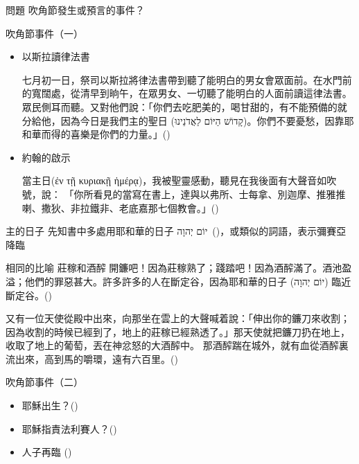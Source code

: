 \documentclass{beamer}
\newcommand{\question}[1]{
\begin{frame}{問題}
    \centering
    \vspace*{1cm}
    \huge #1？\par
    \vfill
\end{frame}
}
\newcommand{\parvspace}{\par\vspace{0.5em}}
\begin{document}
\question{吹角節發生或預言的事件}

\begin{frame}{吹角節事件（一）}
	\begin{itemize}
		\item 以斯拉讀律法書\par
		      \alert{七月初一日}，祭司以斯拉將律法書帶到聽了能明白的男女會眾面前。在水門前的寬闊處，從清早到晌午，在眾男女、一切聽了能明白的人面前讀這律法書。眾民側耳而聽。\textellipsis{}又對他們說：「你們去吃肥美的，喝甘甜的，有不能預備的就分給他，因為今日是\alert{我們主的聖日 (\texthebrew{קָדוֹשׁ הַיּוֹם לַאֲדֹנֵינוּ})}。你們不要憂愁，因靠耶和華而得的喜樂是你們的力量。」()
		\item 約翰的啟示\par
		      \alert{當主日(\textgreek{ἐν τῇ κυριακῇ ἡμέρᾳ})}，我被聖靈感動，聽見在我後面\alert{有大聲音如吹號}，說： 「你所看見的當寫在書上，達與以弗所、士每拿、別迦摩、推雅推喇、撒狄、非拉鐵非、老底嘉那七個教會。」()
	\end{itemize}
\end{frame}

\begin{frame}{主的日子}
	先知書中多處用\alert{耶和華的日子 \texthebrew{יוֹם יְהוָה}}\ ()，或類似的詞語，表示\alert{彌賽亞降臨}\parvspace
\end{frame}

\begin{frame}{相同的比喻 \textemdash 莊稼和酒醡}
	\alert{開鐮}吧！因為\alert{莊稼熟了}；踐踏吧！因為\alert{酒醡滿了}。酒池盈溢；他們的\alert{罪惡甚大}。許多許多的人在斷定谷，因為耶和華的日子 (\texthebrew{יוֹם יְהוָה}) 臨近斷定谷。()\parvspace
	又有一位天使從殿中出來，向那坐在雲上的大聲喊着說：「\alert{伸出你的鐮刀來收割}；因為收割的時候已經到了，\alert{地上的莊稼已經熟透了}。」\textellipsis{}那天使就把鐮刀扔在地上，收取了地上的葡萄，丟在\alert{神忿怒的大酒醡中}。 那酒醡踹在城外，就有血從酒醡裏流出來，\alert{高到馬的嚼環，遠有六百里}。()\parvspace
\end{frame}

\begin{frame}{吹角節事件（二）}
	\begin{itemize}
		\item 耶穌出生？()
		\item 耶穌指責法利賽人？()\parencite{YeshuaInYomTeruah}
		\item 人子再臨 ()
	\end{itemize}
\end{frame}
\end{document}
